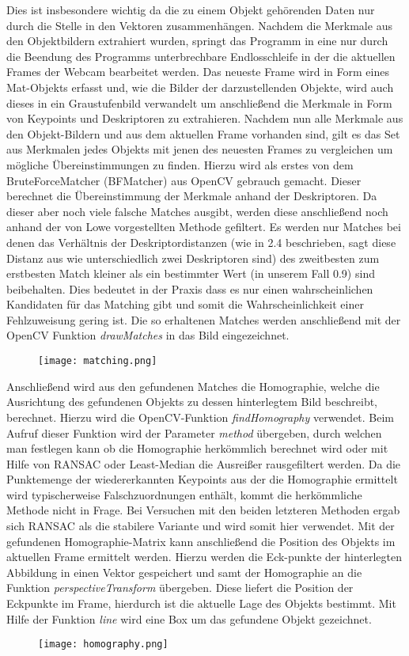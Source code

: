 Dies ist insbesondere wichtig da die zu einem Objekt gehörenden Daten nur durch die Stelle in den Vektoren zusammenhängen.
Nachdem die Merkmale aus den Objektbildern extrahiert wurden, springt das Programm in eine nur durch die Beendung des Programms unterbrechbare Endlosschleife in der die aktuellen Frames der Webcam bearbeitet werden.
Das neueste Frame wird in Form eines Mat-Objekts erfasst und, wie die Bilder der darzustellenden Objekte, wird auch dieses in ein Graustufenbild verwandelt um anschließend die Merkmale in Form von Keypoints und Deskriptoren zu extrahieren.
Nachdem nun alle Merkmale aus den Objekt-Bildern und aus dem aktuellen Frame vorhanden sind, gilt es das Set aus Merkmalen jedes Objekts mit jenen des neuesten Frames zu vergleichen um mögliche Übereinstimmungen zu finden.
Hierzu wird als erstes von dem BruteForceMatcher (BFMatcher) aus OpenCV gebrauch gemacht. Dieser berechnet die Übereinstimmung der Merkmale anhand der Deskriptoren.
Da dieser aber noch viele falsche Matches ausgibt, werden diese anschließend noch anhand der von Lowe vorgestellten Methode gefiltert.
Es werden nur Matches bei denen das Verhältnis der Deskriptordistanzen (wie in 2.4 beschrieben, sagt diese Distanz aus wie unterschiedlich zwei Deskriptoren sind) des zweitbesten zum erstbesten Match kleiner als ein bestimmter Wert (in unserem Fall 0.9) sind beibehalten. 
Dies bedeutet in der Praxis dass es nur einen wahrscheinlichen Kandidaten für das Matching gibt und somit die Wahrscheinlichkeit einer Fehlzuweisung gering ist.
Die so erhaltenen Matches werden anschließend mit der OpenCV Funktion \emph{drawMatches} in das Bild eingezeichnet.
\begin{figure}[h]
\texttt{[image: matching.png]}
\centering
\end{figure}
Anschließend wird aus den gefundenen Matches die Homographie, welche die Ausrichtung des gefundenen Objekts zu dessen hinterlegtem Bild beschreibt, berechnet.
Hierzu wird die OpenCV-Funktion \emph{findHomography} verwendet. Beim Aufruf dieser Funktion wird der Parameter \emph{method} übergeben, durch welchen man festlegen kann ob die Homographie herkömmlich berechnet wird oder mit Hilfe von RANSAC oder Least-Median die Ausreißer rausgefiltert werden.
Da die Punktemenge der wiedererkannten Keypoints aus der die Homographie ermittelt wird typischerweise Falschzuordnungen enthält, kommt die herkömmliche Methode nicht in Frage.
Bei Versuchen mit den beiden letzteren Methoden ergab sich RANSAC als die stabilere Variante und wird somit hier verwendet.
Mit der gefundenen Homographie-Matrix kann anschließend die Position des Objekts im aktuellen Frame ermittelt werden. Hierzu werden die Eck-punkte der hinterlegten Abbildung in einen Vektor gespeichert und samt der Homographie an die Funktion \emph{perspectiveTransform} übergeben. Diese liefert die Position der Eckpunkte im Frame, hierdurch ist die aktuelle Lage des Objekts bestimmt.
Mit Hilfe der Funktion \emph{line} wird eine Box um das gefundene Objekt gezeichnet.
\begin{figure}[h]
\texttt{[image: homography.png]}
\centering
\end{figure}

